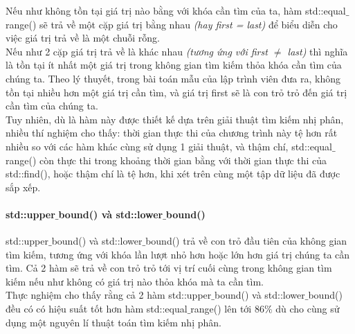 \documentclass{article}
\begin{document}
Nếu như không tồn tại giá trị nào bằng với khóa cần tìm của ta, hàm std::equal$\_$range() sẽ trả về một cặp giá trị bằng nhau \textit{(hay first = last)} để biểu diễn cho việc giá trị trả về là một chuỗi rỗng.\\

Nếu như 2 cặp giá trị trả về là khác nhau \textit{(tương ứng với first $\neq$ last)} thì nghĩa là tồn tại ít nhất một giá trị trong không gian tìm kiếm thỏa khóa cần tìm của chúng ta. Theo lý thuyết, trong bài toán mẫu của lập trình viên đưa ra, không tồn tại nhiều hơn một giá trị cần tìm, và giá trị first sẽ là con trỏ trỏ đến giá trị cần tìm của chúng ta.\\

Tuy nhiên, dù là hàm này được thiết kế dựa trên giải thuật tìm kiếm nhị phân, nhiều thí nghiệm cho thấy: thời gian thực thi của chương trình này tệ hơn rất nhiều so với các hàm khác cùng sử dụng 1 giải thuật, và thậm chí, std::equal$\_$range() còn thực thi trong khoảng thời gian bằng với thời gian thực thi của std::find(), hoặc thậm chí là tệ hơn, khi xét trên cùng một tập dữ liệu đã được sắp xếp.\\
\paragraph{std::upper$\_$bound() và std::lower$\_$bound()}
std::upper$\_$bound() và std::lower$\_$bound() trả về con trỏ đầu tiên của không gian tìm kiếm, tương ứng với khóa lần lượt nhỏ hơn hoặc lớn hơn giá trị chúng ta cần tìm. Cả 2 hàm sẽ trả về con trỏ trỏ tới vị trí cuối cùng trong không gian tìm kiếm nếu như không có giá trị nào thỏa khóa mà ta cần tìm.\\

Thực nghiệm cho thấy rằng cả 2 hàm std::upper$\_$bound() và std::lower$\_$bound() đều có có hiệu suất tốt hơn hàm std::equal$\_$range() lên tới 86$\%$ dù cho cùng sử dụng một nguyên lí thuật toán tìm kiếm nhị phân.
\end{document}
